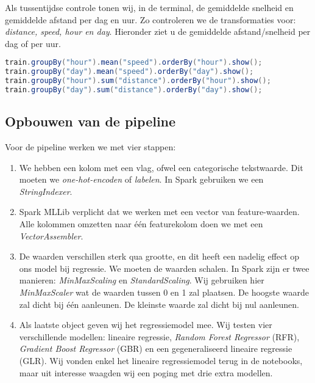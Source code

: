 \documentclass[a4paper,10pt,twoside]{report}
\begin{document}
Als tussentijdse controle tonen wij, in de terminal, de gemiddelde snelheid en gemiddelde afstand per dag en uur. Zo controleren we de transformaties voor: \textit{distance, speed, hour en day}. Hieronder ziet u de gemiddelde afstand/snelheid per dag of per uur. 

\begin{lstlisting}[language=Java]
train.groupBy("hour").mean("speed").orderBy("hour").show();
train.groupBy("day").mean("speed").orderBy("day").show();
train.groupBy("hour").sum("distance").orderBy("hour").show();
train.groupBy("day").sum("distance").orderBy("day").show();
\end{lstlisting}

\newpage


\subsection*{Opbouwen van de pipeline}

Voor de pipeline werken we met vier stappen:

\begin{enumerate}
	\item We hebben een kolom met een vlag, ofwel een categorische tekstwaarde. Dit moeten we \textit{one-hot-encoden} of \textit{labelen}. In Spark gebruiken we een \textit{StringIndexer}.
	
	\item Spark MLLib verplicht dat we werken met een vector van feature-waarden. Alle kolommen omzetten naar één featurekolom doen we met een \textit{VectorAssembler}. 
	
	\item De waarden verschillen sterk qua grootte, en dit heeft een nadelig effect op ons model bij regressie. We moeten de waarden schalen. In Spark zijn er twee manieren: \textit{MinMaxScaling} en \textit{StandardScaling}. Wij gebruiken hier \textit{MinMaxScaler} wat de waarden tussen 0 en 1 zal plaatsen. De hoogste waarde zal dicht bij één aanleunen. De kleinste waarde zal dicht bij nul aanleunen.
	
	\item Als laatste object geven wij het regressiemodel mee. Wij testen vier verschillende modellen: lineaire regressie, \textit{Random Forest Regressor} (RFR), \textit{Gradient Boost Regressor} (GBR) en een gegeneraliseerd lineaire regressie (GLR). Wij vonden enkel het lineaire regressiemodel terug in de notebooks, maar uit interesse waagden wij een poging met drie extra modellen. 
	
\end{enumerate}
\end{document}
